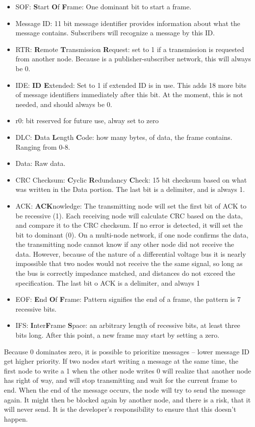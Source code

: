 \begin{itemize}
	\item SOF: \textbf{S}tart \textbf{O}f \textbf{F}rame: One dominant bit to start a frame.
	\item Message ID: 11 bit message identifier provides information about what the message contains. Subscribers will recognize a message by this ID.
	\item RTR: \textbf{R}emote \textbf{T}ransmission \textbf{R}equest: set to 1 if a transmission is requested from another node. Because is a publisher-subscriber network, this will always be 0.
	\item IDE: \textbf{ID E}xtended: Set to 1 if extended ID is in use. This adds 18 more bits of message identifiers immediately after this bit. At the moment, this is not needed, and should always be 0.
	\item r0: bit reserved for future use, alway set to zero
	\item DLC: \textbf{D}ata \textbf{L}ength \textbf{C}ode: how many bytes, of data, the frame contains. Ranging from 0-8.
	\item Data: Raw data. 
	\item CRC Checksum: \textbf{C}yclic \textbf{R}edundancy \textbf{C}heck: 15 bit checksum based on what was written in the Data portion. The last bit is a delimiter, and is always 1.
	\item ACK: \textbf{ACK}nowledge: The transmitting node will set the first bit of ACK to be recessive (1). Each receiving node will calculate CRC based on the data, and compare it to the CRC checksum. If no error is detected, it will set the bit to dominant (0). On a multi-node network, if one node confirms the data, the transmitting node cannot know if any other node did not receive the data. However, because of the nature of a differential voltage bus it is nearly impossible that two nodes would not receive the the same signal, so long as the bus is correctly impedance matched, and distances do not exceed the specification. The last bit o ACK is a delimiter, and always 1
	\item EOF: \textbf{E}nd \textbf{O}f \textbf{F}rame: Pattern signifies the end of a frame, the pattern is 7 recessive bits.
	\item IFS: \textbf{I}nter\textbf{F}rame \textbf{S}pace: an arbitrary length of recessive bits, at least three bits long. After this point, a new frame may start by setting a zero.
\end{itemize}

Because 0 dominates zero, it is possible to prioritize messages -- lower message ID get higher priority.
If two nodes start writing a message at the same time, the first node to write a 1 when the other node writes 0 will realize that another node has right of way, and will stop transmitting and wait for the current frame to end.
When the end of the message occurs, the node will try to send the message again.
It might then be blocked again by another node, and there is a risk, that it will never send.
It is the developer's responsibility to ensure that this doesn't happen.\\

